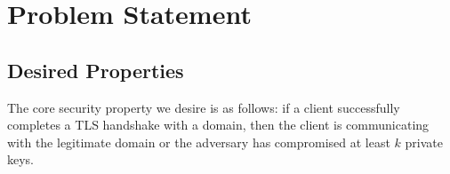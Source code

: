 \section{Problem Statement}
\label{sec:problem}

\subsection{Desired Properties}

The core security property we desire is as follows: if a client successfully
completes a TLS handshake with a domain, then the client is communicating with
the legitimate domain or the adversary has compromised at least $k$ private
keys.


